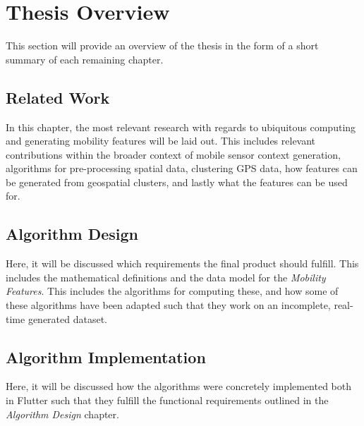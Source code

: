 \section{Thesis Overview}
This section will provide an overview of the thesis in the form of a short summary of each remaining chapter.

\subsection*{Related Work}
In this chapter, the most relevant research with regards to ubiquitous computing and generating mobility features will be laid out. This includes relevant contributions within the broader context of mobile sensor context generation, algorithms for pre-processing spatial data, clustering GPS data, how features can be generated from geospatial clusters, and lastly what the features can be used for.

\subsection*{Algorithm Design}
Here, it will be discussed which requirements the final product should fulfill. This includes the mathematical definitions and the data model for the \textit{Mobility Features}. This includes the algorithms for computing these, and how some of these algorithms have been adapted such that they work on an incomplete, real-time generated dataset.

\subsection*{Algorithm Implementation}
Here, it will be discussed how the algorithms were concretely implemented both in Flutter such that they fulfill the functional requirements outlined in the \textit{Algorithm Design} chapter.

